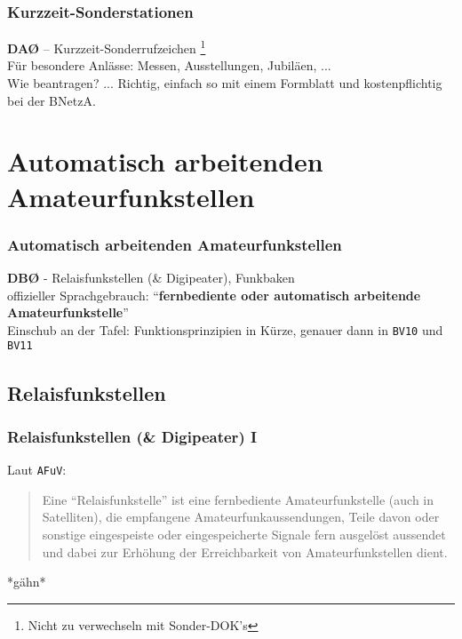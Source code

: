 \begin{frame}
    \frametitle{Kurzzeit-Sonderstationen}

    \textbf{DAØ} -- Kurzzeit-Sonderrufzeichen
    \footnote{Nicht zu verwechseln mit Sonder-DOK's}\\[1em]

    Für besondere Anlässe: Messen, Ausstellungen, Jubiläen, ... \\[3em]

    Wie beantragen? ... Richtig, einfach so mit einem Formblatt und
    kostenpflichtig bei der BNetzA.

\end{frame}

\section{Automatisch arbeitenden Amateurfunkstellen}

\begin{frame}
    \frametitle{Automatisch arbeitenden Amateurfunkstellen}

    \textbf{DBØ} - Relaisfunkstellen (\& Digipeater), Funkbaken \\[1em]

    offizieller Sprachgebrauch: ``\textbf{fernbediente oder automatisch arbeitende
    Amateurfunkstelle}'' \\[3em]

    Einschub an der Tafel: Funktionsprinzipien in Kürze, genauer dann in
    \texttt{BV10} und \texttt{BV11}

\end{frame}

\subsection{Relaisfunkstellen}

\begin{frame}
    \frametitle{Relaisfunkstellen (\& Digipeater) I}

    Laut \texttt{AFuV}: \\[1em]

    \begin{quote}
      Eine ``Relaisfunkstelle'' ist eine fernbediente Amateurfunkstelle
      (auch in Satelliten), die empfangene Amateurfunkaussendungen, Teile davon
      oder sonstige eingespeiste oder eingespeicherte Signale fern ausgelöst
      aussendet und dabei zur Erhöhung der Erreichbarkeit von Amateurfunkstellen
      dient.
    \end{quote}
    *gähn*

\end{frame}

